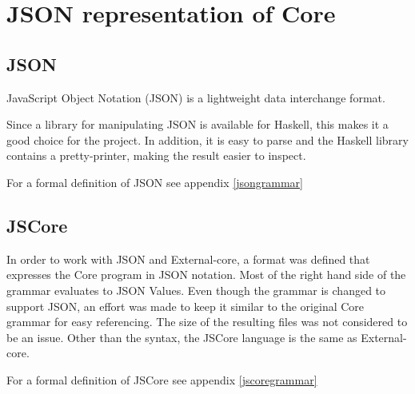 \section{JSON representation of Core}

\subsection{JSON}

JavaScript Object Notation (JSON) is a lightweight data interchange format.

Since a library for manipulating JSON is available for Haskell, this
makes it a good choice for the project. In addition, it is easy to parse and
the Haskell library contains a pretty-printer, making the result easier to
inspect.

For a formal definition of JSON see appendix \ref{jsongrammar}

\subsection{JSCore}

In order to work with JSON and External-core, a format was defined that
expresses the Core program in JSON notation. Most of the right hand side of 
the grammar evaluates to JSON Values. 
Even though the grammar is changed to support JSON, an effort was made to
keep it similar to the original Core grammar for easy referencing. The size
of the resulting files was not considered to be an issue. Other than the 
syntax, the JSCore language is the same as External-core.

For a formal definition of JSCore see appendix \ref{jscoregrammar}

